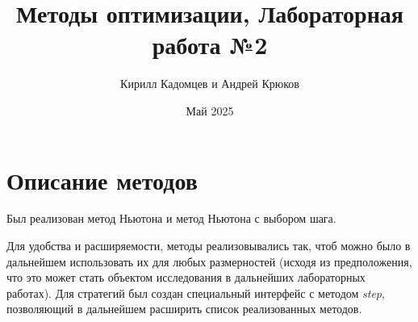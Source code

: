 \documentclass{article}
\title{Методы оптимизации, Лабораторная работа №2}
\author{Кирилл Кадомцев и Андрей Крюков}
\date{Май 2025}
\begin{document}
\maketitle
\tableofcontents

\section{Описание методов}
Был реализован метод Ньютона и метод Ньютона с выбором шага.

Для удобства и расширяемости, методы реализовывались так, чтоб можно было в дальнейшем использовать их для любых размерностей (исходя из предположения, что это может стать объектом исследования в дальнейших лабораторных работах). Для стратегий был создан специальный интерфейс с методом \textit{step}, позволяющий в дальнейшем расширить список реализованных методов.
\end{document}
